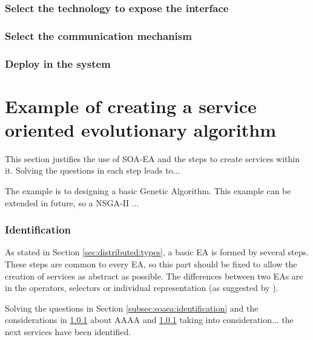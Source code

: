\subsubsection{Select the technology to expose the interface} 

\subsubsection{Select the communication mechanism}

\subsubsection{Deploy in the system} 










\section{Example of creating a service oriented evolutionary algorithm}

This section justifies the use of SOA-EA and the steps to create services within it. Solving the questions in each step leads to... 

The example is to designing a basic Genetic Algorithm. This example can be extended in future, so a NSGA-II ...

\subsubsection{Identification}
As  stated in Section \ref{sec:distributed:types}, a basic EA is formed by several steps. These steps are common to every EA, so this part should be fixed  to allow the creation of services as abstract as possible. The differences between two EAs are in the operators, selectors or individual representation (as suggested by  \cite{ParameterTuningEiben2011}).

Solving the questions in Section \ref{subsec:soaea:identification} and the considerations in \ref{} about AAAA and \ref{} taking into consideration... the next services have been identified.

